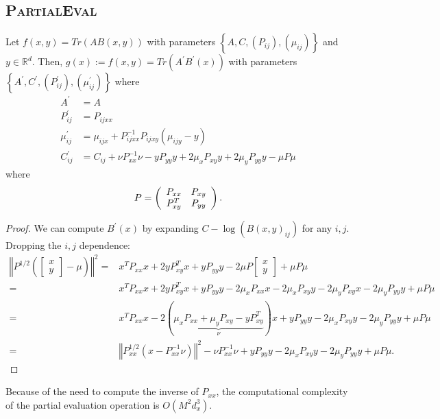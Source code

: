 \subsection{\textsc{PartialEval}}
\begin{proposition}
   Let $f(x, y) = Tr(AB(x, y))$ with parameters $\left\lbrace A, C, (P_{ij}), (\mu_{ij})\right\rbrace$ and $y\in \mathbb R^d$. Then, $g(x):=f(x, y) = Tr(A^\prime B^\prime(x))$ with parameters $\left\lbrace A^\prime, C^\prime, (P^\prime_{ij}), (\mu^\prime_{ij})\right\rbrace$ where
   \begin{align}
       A^\prime &= A\\
       P^\prime_{ij} &= P_{ijxx}\\
       \mu^\prime_{ij} &= \mu_{ijx} + P_{ijxx}^{-1}P_{ijxy}\left(\mu_{ijy} - y\right)\\
        C_{ij}^\prime &= C_{ij} + \nu P_{xx}^{-1}\nu - yP_{yy}y + 2\mu_{x}P_{xy}y + 2\mu_yP_{yy}y-\mu P\mu
       \end{align}
where \begin{equation}
P = \left(\begin{array}{c c}
    P_{xx} & P_{xy}  \\
    P_{xy}^T & P_{yy}
\end{array} \right).
\end{equation}
\end{proposition}
\begin{proof}
We can compute $B^\prime(x)$ by expanding $C - \log(B(x, y)_{ij})$ for any $i,j$. Dropping the $i,j$ dependence:
\begin{align}
     \left\Vert P^{1/2}\left(\begin{bmatrix}x\\ y\end{bmatrix} - \mu \right)\right\Vert^2 =&  x^TP_{xx}x + 2y P_{xy}^Tx + yP_{yy}y - 2\mu P\begin{bmatrix}x\\ y\end{bmatrix}  + \mu P \mu\\
    =&  x^TP_{xx}x + 2y P_{xy}^Tx + yP_{yy}y - 2\mu_x P_{xx}x -2\mu_xP_{xy}y -2\mu_yP_{xy}x -2\mu_yP_{yy}y + \mu P \mu\\
    =&  x^TP_{xx}x -2(\underbrace{\mu_xP_{xx}+\mu_y P_{xy} -yP_{xy}^T}_\nu)x + yP_{yy}y -2\mu_xP_{xy}y -2\mu_yP_{yy}y + \mu P \mu\\
    =&  \left\Vert P_{xx}^{1/2}\left(x - P_{xx}^{-1}\nu\right)\right\Vert^2 - \nu P_{xx}^{-1}\nu + yP_{yy}y -2\mu_xP_{xy}y -2\mu_yP_{yy}y + \mu P \mu.
\end{align}
\end{proof}
\begin{remark}
Because of the need to compute the inverse of $P_{xx}$, the computational complexity of the partial evaluation operation is $O(M^2d_x^3)$.
\end{remark}

